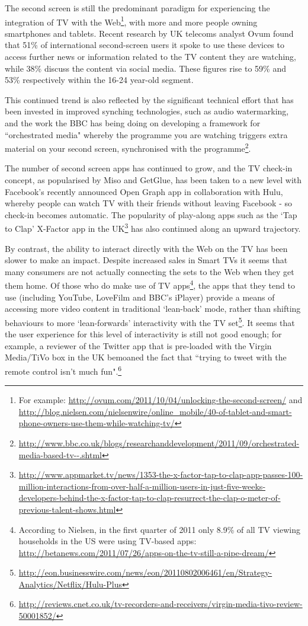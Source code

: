 \documentclass{notube}
\begin{document}
The second screen is still the predominant paradigm for experiencing the integration of TV with the Web\footnote{For example: \url{http://ovum.com/2011/10/04/unlocking-the-second-screen/} and \url{http://blog.nielsen.com/nielsenwire/online_mobile/40-of-tablet-and-smart-phone-owners-use-them-while-watching-tv/}}, with more and more people owning smartphones and tablets. Recent research by UK telecoms analyst Ovum found that 51\% of international second-screen users it spoke to use these devices to access further news or information related to the TV content they are watching, while 38\% discuss the content via social media. These figures rise to 59\% and 53\% respectively within the 16-24 year-old segment.

This continued trend is also reflected by the significant technical effort that has been invested in improved synching technologies, such as audio watermarking, and the work the BBC has being doing on developing a framework for ``orchestrated media" whereby the programme you are watching triggers extra material on your second screen, synchronised with the programme\footnote{\url{http://www.bbc.co.uk/blogs/researchanddevelopment/2011/09/orchestrated-media-based-tv--.shtml}}. 

The number of second screen apps has continued to grow, and the TV check-in concept, as popularised by Miso and GetGlue, has been taken to a new level with Facebook's recently announced Open Graph app in collaboration with Hulu, whereby people can watch TV with their friends without leaving Facebook - so check-in becomes automatic. The popularity of play-along apps such as the `Tap to Clap' X-Factor app in the UK\footnote{\url{http://www.appmarket.tv/news/1353-the-x-factor-tap-to-clap-app-passes-100-million-interactions-from-over-half-a-million-users-in-just-five-weeks-developers-behind-the-x-factor-tap-to-clap-resurrect-the-clap-o-meter-of-previous-talent-shows.html}} has also continued along an upward trajectory. 

By contrast, the ability to interact directly with the Web on the TV has been slower to make an impact. Despite increased sales in Smart TVs it seems that many consumers are not actually connecting the sets to the Web when they get them home. Of those who do make use of TV apps\footnote{According to Nielsen, in the first quarter of 2011 only 8.9\% of all TV viewing households in the US were using TV-based apps: \url{http://betanews.com/2011/07/26/apps-on-the-tv-still-a-pipe-dream/}}, the apps that they tend to use (including YouTube, LoveFilm and BBC's iPlayer) provide a means of accessing more video content in traditional `lean-back' mode, rather than shifting behaviours to more `lean-forwards' interactivity with the TV set\footnote{\url{http://eon.businesswire.com/news/eon/20110802006461/en/Strategy-Analytics/Netflix/Hulu-Plus}}. It seems that the user experience for this level of interactivity is still not good enough; for example, a reviewer of the Twitter app that is pre-loaded with the Virgin Media/TiVo box in the UK bemoaned the fact that ``trying to tweet with the remote control isn't much fun".\footnote{\url{http://reviews.cnet.co.uk/tv-recorders-and-receivers/virgin-media-tivo-review-50001852/}}
\end{document}
